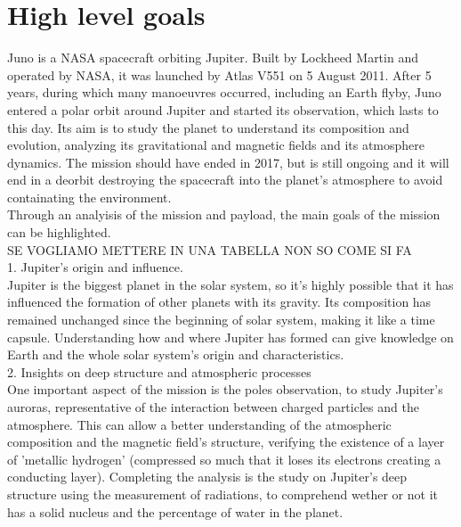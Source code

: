 \section{High level goals}
\label{sec:goals}
Juno is a NASA spacecraft orbiting Jupiter. Built by Lockheed Martin and operated by NASA, it was launched by Atlas V551 on 5 August 2011. After 5 years, during which many manoeuvres occurred, including an Earth flyby, Juno entered a polar orbit around Jupiter and started its observation, which lasts to this day. Its aim is to study the planet to understand its composition and evolution, analyzing its gravitational and magnetic fields and its atmosphere dynamics. The mission should have ended in 2017, but is still ongoing and it will end in a deorbit destroying the spacecraft into the planet's atmosphere to avoid containating the environment. 
\\   

Through an analyisis of the mission and payload, the main goals of the mission can be highlighted. \\


SE VOGLIAMO METTERE IN UNA TABELLA NON SO COME SI FA \\

1. Jupiter's origin and influence. \\
Jupiter is the biggest planet in the solar system, so it's highly possible that it has influenced the formation of other planets with its gravity. Its composition has remained unchanged since the beginning of solar system, making it like a time capsule.  Understanding how and where Jupiter has formed can give knowledge on Earth and the whole solar
system’s origin and characteristics. \\

2. Insights on deep structure and atmospheric processes\\
One important aspect of the mission is the poles observation, to study Jupiter's auroras, representative of the interaction between charged particles and the atmosphere. This can allow a better understanding of the atmospheric composition and the magnetic field's structure, verifying the existence of a layer of 'metallic hydrogen' (compressed so much that it loses its electrons creating a conducting layer). Completing the analysis is the study on Jupiter's deep structure using the measurement of radiations, to comprehend wether or not it has a solid nucleus and the percentage of water in the planet.\\

